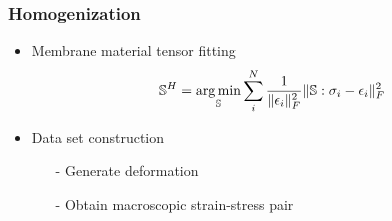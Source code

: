 \documentclass[serif,mathserif, 12pt]{beamer}
\newcommand{\argmin}{\operatornamewithlimits{arg\min}}
\begin{document}
\begin{frame}
  \frametitle{Homogenization}
  \begin{itemize}
  \item Membrane material tensor fitting
    \[
    \mathbb{S}^H = \argmin_{\mathbb{S}} \sum_i^N \frac{1}{\|\epsilon_i\|_F^2}\|\mathbb{S}:\sigma_i-\epsilon_i\|_F^2
    \]
    \pause
  \item Data set construction
    \begin{itemize}
    \item[-] Generate deformation
    \item[-] Obtain macroscopic strain-stress pair
    \end{itemize}
  \end{itemize}
\end{frame}
\end{document}
